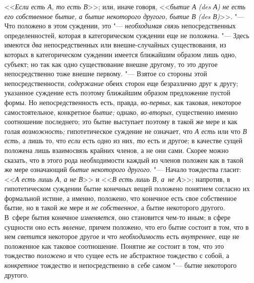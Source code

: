 <<{\em Если есть А, то есть В}>>; или, иначе говоря,
<<{\em бытие А (des А) не есть его
собственное бытие, а бытие некоторого другого, бытие В (des В)}>>. "---
Что положено в этом суждении, это "--- {\em необходимая связь}
непосредственных определенностей, которая в категорическом
суждении еще не положена. "--- Здесь имеются {\em два}
непосредственных или внешне-случайных существования, из
которых в категорическом суждении имеется ближайшим образом лишь одно,
субъект; но так как одно существование внешне другому, то это другое
непосредственно тоже внешне первому. "--- Взятое со стороны
этой непосредственности, {\em содержание} обеих
сторон еще безразлично друг к другу; указанное суждение есть поэтому
ближайшим образом предложение пустой формы. Но непосредственность есть,
правда, {\em во-первых}, как таковая, некоторое самостоятельное, конкретное
{\em бытие;} однако, {\em во-вторых},
существенно именно соотношение последнего; это бытие
выступает поэтому в такой же мере и как голая {\em возможность;}
гипотетическое суждение не означает, что {\em А есть} или что
{\em В есть}, а лишь то, что {\em если} есть одно из них, {\em то} есть и
другое; в качестве сущей положена лишь взаимосвязь крайних членов, а не они
сами. Скорее можно сказать, что в этого рода необходимости каждый из членов
положен как в такой же мере означающий {\em бытие некоторого другого}. "---
Начало тождества гласит: <<{\em А есть лишь А, а не В}>> и <<{\em В есть лишь
В, а~не А}>>; напротив, в гипотетическом суждении бытие конечных
вещей положено понятием согласно их формальной истине, а именно, положено,
что конечное есть свое собственное бытие, но в такой же мере и
{\em не собственное}, а бытие некоторого другого. В~сфере бытия конечное
{\em изменяется}, оно становится чем-то иным; в сфере сущности оно есть
{\em явление}, причем положено, что его бытие состоит в том, что в нем
{\em светится} некоторое другое и что {\em необходимость} есть
{\em внутреннее}, еще не положенное как таковое соотношение. Понятие же
состоит в том, что это тождество {\em положено}
и что сущее есть не абстрактное тождество с собой, а {\em конкретное}
тождество и непосредственно в~себе самом "--- бытие некоторого другого.

